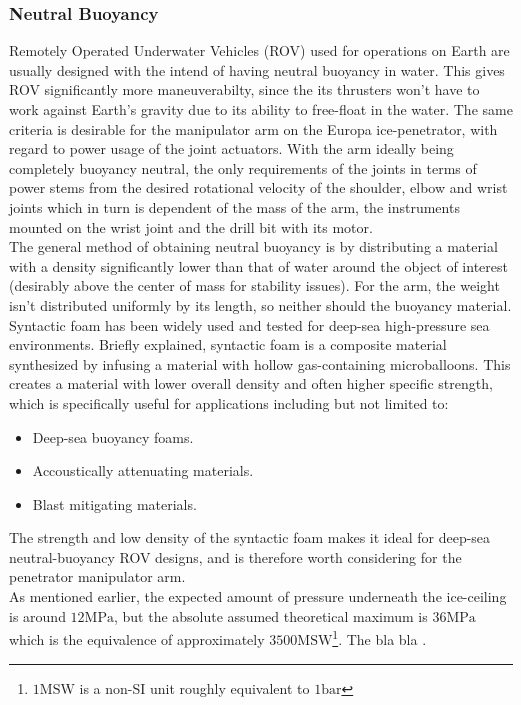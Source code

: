\subsubsection{Neutral Buoyancy}
Remotely Operated Underwater Vehicles (ROV) used for operations on Earth are usually designed with the intend of having neutral buoyancy in water. This gives ROV significantly more maneuverabilty, since the its thrusters won't have to work against Earth's gravity due to its ability to free-float in the water. The same criteria is desirable for the manipulator arm on the Europa ice-penetrator, with regard to power usage of the joint actuators. With the arm ideally being completely buoyancy neutral, the only requirements of the joints in terms of power stems from the desired rotational velocity of the shoulder, elbow and wrist joints which in turn is dependent of the mass of the arm, the instruments mounted on the wrist joint and the drill bit with its motor.\\
The general method of obtaining neutral buoyancy is by distributing a material with a density significantly lower than that of water around the object of interest (desirably above the center of mass for stability issues). For the arm, the weight isn't distributed uniformly by its length, so neither should the buoyancy material. Syntactic foam has been widely used and tested for deep-sea high-pressure sea environments. Briefly explained, syntactic foam is a composite material synthesized by infusing a material with hollow gas-containing microballoons. This creates a material with lower overall density and often higher specific strength, which is specifically useful for applications including but not limited to:
\begin{itemize}
\item Deep-sea buoyancy foams.
\item Accoustically attenuating materials.
\item Blast mitigating materials.
\end{itemize}
The strength and low density of the syntactic foam makes it ideal for deep-sea neutral-buoyancy ROV designs, and is therefore worth considering for the penetrator manipulator arm.\\
As mentioned earlier, the expected amount of pressure underneath the ice-ceiling is around $12 \mathrm{MPa}$, but the absolute assumed theoretical maximum is $36 \mathrm{MPa}$ which is the equivalence of approximately $3500 \mathrm{MSW}$\footnote{$1 \mathrm{MSW}$ is a non-SI unit roughly equivalent to $1 \mathrm{bar}$}. The bla bla \cite{Foam}.

